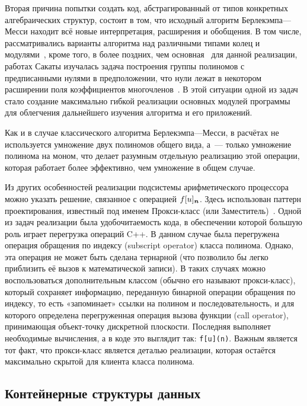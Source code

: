 \documentclass[14pt]{extarticle}
\begin{document}
Вторая причина попытки создать код, абстрагированный от типов конкретных
алгебраических структур, состоит в том, что исходный алгоритм Берлекэмпа—Месси
находит всё новые интерпретация, расширения и обобщения. В том числе,
рассматривались варианты алгоритма над различными типами колец и
модулями~\cite{Kurakin94,Kurakin99}, кроме того, в более поздних, чем
основная~\cite{Sakata88} для данной реализации, работах
Сакаты изучалась задача построения группы полиномов с предписанными нулями
в предположении, что нули лежат в некотором расширении поля коэффициентов
многочленов~\cite{Sakata89}. В этой ситуации одной из задач стало создание
максимально гибкой реализации основных модулей программы для облегчения
дальнейшего изучения алгоритма и его приложений.

Как и в случае классического
алгоритма Берлекэмпа—Месси, в расчётах не используется умножение двух полиномов
общего вида, а~— только умножение полинома на моном, что делает разумным
отдельную реализацию этой операции, которая работает более эффективно, чем
умножение в общем случае.

Из других особенностей реализации подсистемы арифметического процессора можно
указать решение, связанное с операцией $f[u]_{\boldsymbol{n}}$. Здесь использован
паттерн проектирования, известный под именем Прокси-класс (или
Заместитель)~\cite{GoF}. Одной из задач реализации была удобочитаемость кода,
в обеспечении которой большую роль играет перегрузка операций C++. В данном
случае была перегружена операция обращения по индексу (subscript operator) класса
полинома. Однако, эта операция не может быть сделана тернарной (что позволило бы
легко приблизить её вызов к математической записи). В таких случаях можно
воспользоваться дополнительным классом (обычно его называют прокси-класс),
который сохраняет информацию, переданную бинарной операции обращения по индексу,
то есть «запоминает» ссылки на полином и последовательность, и для которого
определена перегруженная операция вызова функции (call operator), принимающая
объект-точку дискретной плоскости. Последняя выполняет необходимые вычисления, а
в коде это выглядит так: \texttt{f[u](n)}. Важным является тот факт, что
прокси-класс является деталью реализации, которая остаётся максимально скрытой
для клиента класса полинома.

\subsection{Контейнерные структуры данных}
\label{Containers}
\end{document}
